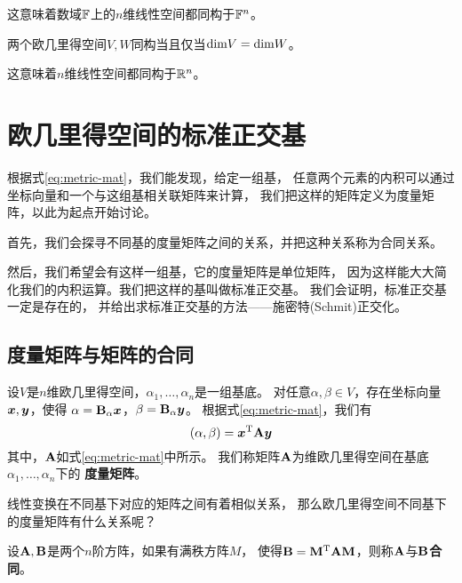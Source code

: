 \begin{remark}
  这意味着数域$\mathbb{F}$上的$n$维线性空间都同构于$\mathbb{F}^n$。
\end{remark}

\begin{theorem}[欧几里得空间同构的充要条件]
  两个欧几里得空间$V,W$同构当且仅当$\textrm{dim} V = \textrm{dim} W$。
\end{theorem}

\begin{remark}
  这意味着$n$维线性空间都同构于$\mathbb{R}^n$。
\end{remark}

\section{欧几里得空间的标准正交基}
根据式\eqref{eq:metric-mat}，我们能发现，给定一组基，
任意两个元素的内积可以通过坐标向量和一个与这组基相关联矩阵来计算，
我们把这样的矩阵定义为度量矩阵，以此为起点开始讨论。

首先，我们会探寻不同基的度量矩阵之间的关系，并把这种关系称为合同关系。

然后，我们希望会有这样一组基，它的度量矩阵是单位矩阵，
因为这样能大大简化我们的内积运算。我们把这样的基叫做标准正交基。
我们会证明，标准正交基一定是存在的，
并给出求标准正交基的方法——施密特(Schmit)正交化。

\subsection{度量矩阵与矩阵的合同}
\begin{definition}[度量矩阵]
  设$V$是$n$维欧几里得空间，$\alpha_1,\dots,\alpha_n$是一组基底。
  对任意$\alpha,\beta\in V$，存在坐标向量$\bm{x},\bm{y}$，使得
  $\alpha=\mathbf{B}_{\alpha}\bm{x}$，$\beta=\mathbf{B}_{\alpha}\bm{y}$。
  根据式\eqref{eq:metric-mat}，我们有
  \begin{displaymath}
    (\alpha,\beta) = \bm{x}^{\textrm{T}}\mathbf{A}\bm{y}
  \end{displaymath}
  其中，$\mathbf{A}$如式\eqref{eq:metric-mat}中所示。
  我们称矩阵$\mathbf{A}$为维欧几里得空间在基底$\alpha_1,\dots,\alpha_n$下的
  \textbf{度量矩阵}。
\end{definition}

线性变换在不同基下对应的矩阵之间有着相似关系，
那么欧几里得空间不同基下的度量矩阵有什么关系呢？

\begin{definition}[矩阵的合同]
  设$\mathbf{A},\mathbf{B}$是两个$n$阶方阵，如果有满秩方阵$M$，
  使得$\mathbf{B}=\mathbf{M}^{\textrm{T}}\mathbf{A}\mathbf{M}$，则称$\mathbf{A}$与$\mathbf{B}$\textbf{合同}。
\end{definition}

